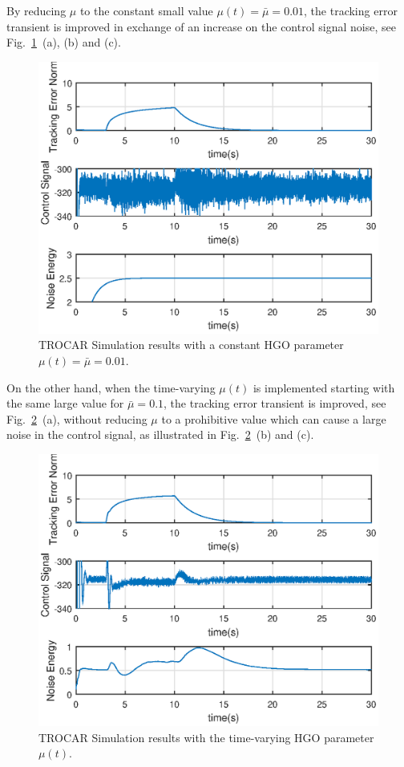 \documentclass[letterpaper, 10 pt, conference]{ieeeconf}  %
\theoremstyle{plain}
\theoremstyle{definition}
\theoremstyle{remark}
\begin{document}
%
By reducing $\mu$ to the constant small value $\mu(t)=\bar{\mu}\!=\!0.01$, the  tracking error transient is improved in exchange of an increase on the control signal noise, see  Fig.~\ref{fig:timevarying2}~(a), (b) and (c).
%
\begin{figure}[h!]
\begin{center}
\includegraphics[width = 13cm]{Figs/mu0dot01-30sec.eps}
\caption{TROCAR Simulation results with a constant HGO parameter $\mu(t)=\bar{\mu}\!=\!0.01$.}
\label{fig:timevarying2}
\end{center}
\end{figure}
%
On the other hand, when the time-varying $\mu(t)$ is implemented starting with the same large value for
$\bar{\mu}\!=\!0.1$,
the tracking error transient is improved, see Fig.~\ref{fig:timevarying3}~(a), without reducing $\mu$ to a prohibitive value which can cause a large noise in the control signal, as illustrated in Fig.~\ref{fig:timevarying3}~(b) and (c). 
%
\begin{figure}[h!]
\begin{center}
\includegraphics[width = 13cm]{Figs/muVar-30sec.eps}
\caption{TROCAR Simulation results with the time-varying HGO parameter $\mu(t)$.}
\label{fig:timevarying3}
\end{center}
\end{figure}
\end{document}
